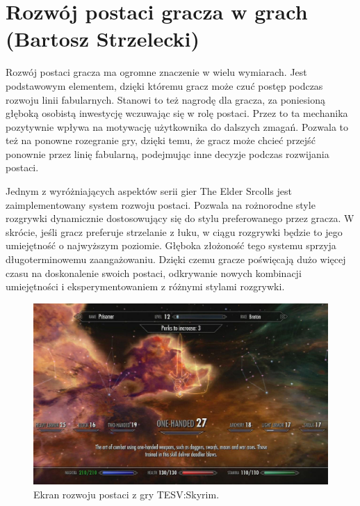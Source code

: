 \section{Rozwój postaci gracza w grach (Bartosz Strzelecki)}\label{s:wpr_progres}
Rozwój postaci gracza ma ogromne znaczenie w wielu wymiarach. Jest podstawowym elementem, dzięki któremu gracz może czuć postęp podczas rozwoju linii fabularnych. 
Stanowi to też nagrodę dla gracza, za poniesioną głęboką osobistą inwestycję wczuwając się w rolę postaci. Przez to ta mechanika pozytywnie
wpływa na motywację użytkownika do dalszych zmagań. Pozwala to też na ponowne rozegranie gry, dzięki temu, że gracz może chcieć przejść
ponownie przez linię fabularną, podejmując inne decyzje podczas rozwijania postaci.

Jednym z wyróżniających aspektów serii gier The Elder Srcolls jest zaimplementowany system rozwoju postaci. Pozwala na rożnorodne
style rozgrywki dynamicznie dostosowujący się do stylu preferowanego przez gracza. W skrócie, jeśli gracz preferuje strzelanie z łuku,
w ciągu rozgrywki będzie to jego umiejętność o najwyższym poziomie. Głęboka złożoność tego systemu sprzyja długoterminowemu zaangażowaniu.
Dzięki czemu gracze poświęcają dużo więcej czasu na doskonalenie swoich postaci, odkrywanie nowych kombinacji umiejętności i eksperymentowaniem z różnymi
stylami rozgrywki.

\begin{figure}[h]
\centering
\includegraphics[width=1.0\textwidth]{images/tes.jpg}
\caption{Ekran rozwoju postaci z gry TESV:Skyrim.}
\end{figure}
